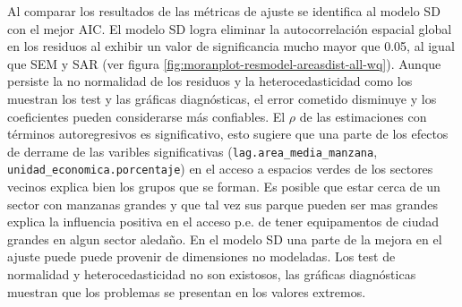 \documentclass[12pt,]{book}
\begin{document}
Al comparar los resultados de las métricas de ajuste se identifica al
modelo SD con el mejor AIC. El modelo SD logra eliminar la
autocorrelación espacial global en los residuos al exhibir un valor de
significancia mucho mayor que 0.05, al igual que SEM y SAR (ver figura
\ref{fig:moranplot-resmodel-areasdist-all-wq}). Aunque persiste la no
normalidad de los residuos y la heterocedasticidad como los muestran los
test y las gráficas diagnósticas, el error cometido disminuye y los
coeficientes pueden considerarse más confiables. El \(\rho\) de las
estimaciones con términos autoregresivos es significativo, esto sugiere
que una parte de los efectos de derrame de las varibles significativas
(\texttt{lag.area\_media\_manzana},
\texttt{unidad\_economica.porcentaje}) en el acceso a espacios verdes de
los sectores vecinos explica bien los grupos que se forman. Es posible
que estar cerca de un sector con manzanas grandes y que tal vez sus
parque pueden ser mas grandes explica la influencia positiva en el
acceso p.e. de tener equipamentos de ciudad grandes en algun sector
aledaño. En el modelo SD una parte de la mejora en el ajuste puede puede
provenir de dimensiones no modeladas. Los test de normalidad y
heterocedasticidad no son existosos, las gráficas diagnósticas muestran
que los problemas se presentan en los valores extremos.
\end{document}
